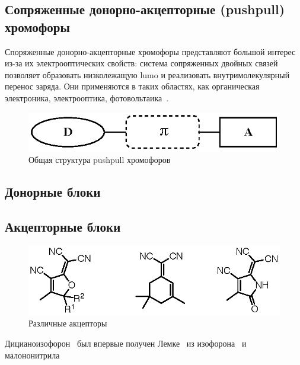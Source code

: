 \subsection{Сопряженные донорно-акцепторные (\ac{pushpull}) хромофоры}

Споряженные донорно-акцепторные хромофоры представляют большой интерес из-за их электрооптических свойств: система сопряженных двойных связей позволяет образовать низколежащую \ac{lumo} и реализовать внутримолекулярный перенос заряда. Они применяются в таких областях, как органическая электроника, электрооптика, фотовольтаика~\cite{Bures2014a}.

\begin{figure}
    \centering
    \includegraphics{sections/literature/img/D-p-A_chromophores.eps}
    \caption{Общая структура \ac{pushpull} хромофоров}
    \label{fig:D-p-A_chromophores}
\end{figure}

\subsection{Донорные блоки}

\subsection{Акцепторные блоки}

\begin{figure}
    \centering
    \includegraphics{sections/literature/img/acceptors.eps}
    \caption{Различные акцепторы~\cite{Dalton2010a}}
    \label{fig:acceptors}
\end{figure}

Дицианоизофорон~\textbf{} был впервые получен Лемке~\cite{Lemke1974} из изофорона~\textbf{} и малононитрила

